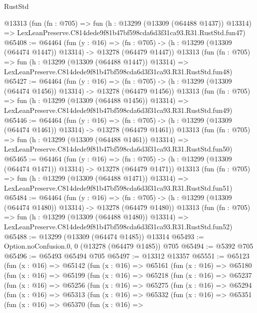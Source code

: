 \begin{lexlean}{RustStd}
\begin{coremodule}
    @13313
    (fun (fn : @705) =>
    fun (h : @13299 (@13309 (@64488 @1437)) @13314) =>
    LexLeanPreserve.C814dede9f81b47bf598cda6d3f31ca93.R31.RustStd.fun47)
@65408 := @64464
    (fun (y : @16) =>
    (fn : @705) -> (h : @13299 (@13309 (@64474 @1447)) @13314) -> @13278 (@64479 @1447))
    @13313
    (fun (fn : @705) =>
    fun (h : @13299 (@13309 (@64488 @1447)) @13314) =>
    LexLeanPreserve.C814dede9f81b47bf598cda6d3f31ca93.R31.RustStd.fun48)
@65427 := @64464
    (fun (y : @16) =>
    (fn : @705) -> (h : @13299 (@13309 (@64474 @1456)) @13314) -> @13278 (@64479 @1456))
    @13313
    (fun (fn : @705) =>
    fun (h : @13299 (@13309 (@64488 @1456)) @13314) =>
    LexLeanPreserve.C814dede9f81b47bf598cda6d3f31ca93.R31.RustStd.fun49)
@65446 := @64464
    (fun (y : @16) =>
    (fn : @705) -> (h : @13299 (@13309 (@64474 @1461)) @13314) -> @13278 (@64479 @1461))
    @13313
    (fun (fn : @705) =>
    fun (h : @13299 (@13309 (@64488 @1461)) @13314) =>
    LexLeanPreserve.C814dede9f81b47bf598cda6d3f31ca93.R31.RustStd.fun50)
@65465 := @64464
    (fun (y : @16) =>
    (fn : @705) -> (h : @13299 (@13309 (@64474 @1471)) @13314) -> @13278 (@64479 @1471))
    @13313
    (fun (fn : @705) =>
    fun (h : @13299 (@13309 (@64488 @1471)) @13314) =>
    LexLeanPreserve.C814dede9f81b47bf598cda6d3f31ca93.R31.RustStd.fun51)
@65484 := @64464
    (fun (y : @16) =>
    (fn : @705) -> (h : @13299 (@13309 (@64474 @1480)) @13314) -> @13278 (@64479 @1480))
    @13313
    (fun (fn : @705) =>
    fun (h : @13299 (@13309 (@64488 @1480)) @13314) =>
    LexLeanPreserve.C814dede9f81b47bf598cda6d3f31ca93.R31.RustStd.fun52)
@65488 := @13299 (@13309 (@64474 @1485)) @13314
@65493 := Option.noConfusion.{0, 0} (@13278 (@64479 @1485)) @705
@65494 := @5392 @705
@65496 := @65493 @65494 @705
@65497 := @13312 @13357
@65551 := @65123
    (fun (x : @16) =>
    @65142
      (fun (x : @16) =>
      @65161
        (fun (x : @16) =>
        @65180
          (fun (x : @16) =>
          @65199
            (fun (x : @16) =>
            @65218
              (fun (x : @16) =>
              @65237
                (fun (x : @16) =>
                @65256
                  (fun (x : @16) =>
                  @65275
                    (fun (x : @16) =>
                    @65294
                      (fun (x : @16) =>
                      @65313
                        (fun (x : @16) =>
                        @65332
                          (fun (x : @16) =>
                          @65351
                            (fun (x : @16) =>
                            @65370
                              (fun (x : @16) =>

\end{coremodule}
\end{lexlean}
